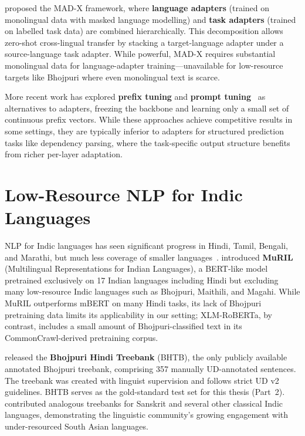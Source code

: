 \documentclass[12pt,a4paper,oneside]{report}
\newcommand{\xlmr}{XLM-RoBERTa}
\begin{document}
\citet{pfeiffer2020madx} proposed the \textsc{MAD-X} framework, where
\textbf{language adapters} (trained on monolingual data with masked language
modelling) and \textbf{task adapters} (trained on labelled task data) are
combined hierarchically. This decomposition allows zero-shot cross-lingual
transfer by stacking a target-language adapter under a source-language task
adapter. While powerful, MAD-X requires substantial monolingual data for
language-adapter training---unavailable for low-resource targets like Bhojpuri
where even monolingual text is scarce.

More recent work has explored \textbf{prefix tuning} and \textbf{prompt
tuning}~\citep{li2021prefix,lester2021power} as alternatives to adapters, freezing
the backbone and learning only a small set of continuous prefix vectors. While
these approaches achieve competitive results in some settings, they are typically
inferior to adapters for structured prediction tasks like dependency parsing,
where the task-specific output structure benefits from richer per-layer
adaptation.

\section{Low-Resource NLP for Indic Languages}

NLP for Indic languages has seen significant progress in Hindi, Tamil, Bengali,
and Marathi, but much less coverage of smaller
languages~\citep{kakwani2020indicnlpsuite}. \citet{khanuja2021muril} introduced
\textbf{MuRIL} (Multilingual Representations for Indian Languages), a BERT-like
model pretrained exclusively on 17 Indian languages including Hindi but excluding
many low-resource Indic languages such as Bhojpuri, Maithili, and Magahi. While
MuRIL outperforms mBERT on many Hindi tasks, its lack of Bhojpuri pretraining
data limits its applicability in our setting; \xlmr{}, by contrast, includes a
small amount of Bhojpuri-classified text in its CommonCrawl-derived pretraining
corpus.

\citet{bhtb2022} released the \textbf{Bhojpuri Hindi Treebank} (BHTB), the only
publicly available annotated Bhojpuri treebank, comprising 357 manually
UD-annotated sentences. The treebank was created with linguist supervision and
follows strict UD v2 guidelines. BHTB serves as the gold-standard test set for
this thesis (Part~2). \citet{ojha2019sanskrit} contributed analogous treebanks
for Sanskrit and several other classical Indic languages, demonstrating the
linguistic community's growing engagement with under-resourced South Asian
languages.
\end{document}
